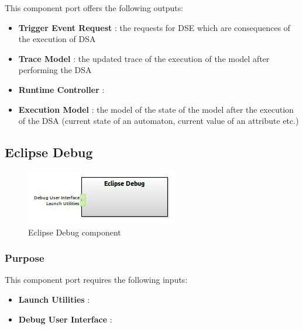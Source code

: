 \documentclass{gemoc} %
\begin{document}
This component port offers the following outputs:
\begin{itemize}
  \item \textbf{Trigger Event Request} :
    the requests for DSE which are consequences of the execution of DSA
  \item \textbf{Trace Model} :
    the updated trace of the execution of the model after performing the DSA
  \item \textbf{Runtime Controller} :
  \item \textbf{Execution Model} :
    the model of the state of the model after the execution of the DSA (current state of an automaton, current value of an attribute etc.)
\end{itemize}

\subsection{Eclipse Debug}

\begin{figure}[htp]
	\begin{center}
	\includegraphics*[trim=0.0cm 0.0cm 0cm 0.0cm, clip=true, scale=1.0]{../images/generated/Generated_Eclipse Debug.jpg}
	\caption{Eclipse Debug component}
	\end{center}
\end{figure}

\subsubsection{Purpose}

This component port requires the following inputs:
\begin{itemize}
  \item \textbf{Launch Utilities} :
  \item \textbf{Debug User Interface} :
\end{itemize}
\end{document}
